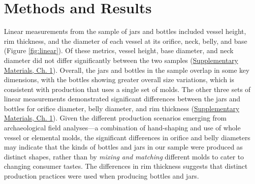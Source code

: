 \documentclass[]{interact}
\theoremstyle{plain}%
\theoremstyle{definition}
\theoremstyle{remark}
\begin{document}
\hypertarget{methods-and-results}{%
\section{Methods and Results}\label{methods-and-results}}

Linear measurements from the sample of jars and bottles included vessel
height, rim thickness, and the diameter of each vessel at its orifice,
neck, belly, and base (Figure \ref{fig:linear}). Of these metrics,
vessel height, base diameter, and neck diameter did not differ
significantly between the two samples
(\href{https://seldenlab.github.io/peru.bottle.jar/linear-chim\%C3\%BA-vessel-metrics.html}{Supplementary
Materials, Ch. 1}). Overall, the jars and bottles in the sample overlap
in some key dimensions, with the bottles showing greater overall size
variations, which is consistent with production that uses a single set
of molds. The other three sets of linear measurements demonstrated
significant differences between the jars and bottles for orifice
diameter, belly diameter, and rim thickness
(\href{https://seldenlab.github.io/peru.bottle.jar/linear-chim\%C3\%BA-vessel-metrics.html}{Supplementary
Materials, Ch. 1}). Given the different production scenarios emerging
from archaeological field analyses---a combination of hand-shaping and
use of whole vessel or elemental molds, the significant differences in
orifice and belly diameters may indicate that the kinds of bottles and
jars in our sample were produced as distinct shapes, rather than by
\emph{mixing and matching} different molds to cater to changing consumer
tastes. The differences in rim thickness suggests that distinct
production practices were used when producing bottles and jars.
\end{document}
